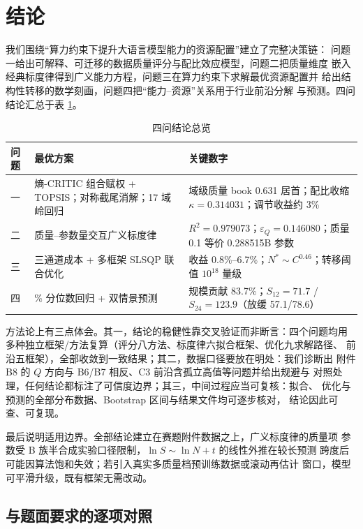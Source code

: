 \section{结论}

我们围绕``算力约束下提升大语言模型能力的资源配置''建立了完整决策链：
问题一给出可解释、可迁移的数据质量评分与配比效应模型，问题二把质量维度
嵌入经典标度律得到广义能力方程，问题三在算力约束下求解最优资源配置并
给出结构性转移的数学刻画，问题四把``能力--资源''关系用于行业前沿分解
与预测。四问结论汇总于表 \ref{tab:conclusion}。

\begin{table}[htbp]
\centering
\caption{四问结论总览}
\label{tab:conclusion}
\small
\begin{tabular}{>{\raggedright\arraybackslash}p{1.7cm}|>{\raggedright\arraybackslash}p{3.6cm}|>{\raggedright\arraybackslash}p{4.7cm}}
\toprule
问题 & 最优方案 & 关键数字 \\
\midrule
一 & 熵-CRITIC 组合赋权 + TOPSIS；对称截尾消解；17 域岭回归 & 域级质量 book 0.631 居首；配比收缩 $\kappa=0.314031$；调节收益约 3\% \\
二 & 质量--参数量交互广义标度律 & $R^2=0.979073$；$\varepsilon_Q=0.146080$；质量 0.1 等价 0.288515B 参数 \\
三 & 三通道成本 + 多框架 SLSQP 联合优化 & 收益 0.8\%--6.7\%；$N^{*}\sim C^{0.46}$；转移阈值 $10^{18}$ 量级 \\
四 & 90\% 分位数回归 + 双情景预测 & 规模贡献 83.7\%；$S_{12}=71.7$ / $S_{24}=123.9$（放缓 57.1/78.6） \\
\bottomrule
\end{tabular}
\end{table}

方法论上有三点体会。其一，结论的稳健性靠交叉验证而非断言：四个问题均用
多种独立框架/方法复算（评分八方法、标度律六拟合框架、优化九求解路径、
前沿五框架），全部收敛到一致结果；其二，数据口径要放在明处：我们诊断出
附件 B8 的 $Q$ 方向与 B6/B7 相反、C3 前沿含孤立高值等问题并给出规避与
对照处理，任何结论都标注了可信度边界；其三，中间过程应当可复核：拟合、
优化与预测的全部分布数据、Bootstrap 区间与结果文件均可逐步核对，
结论因此可查、可复现。

最后说明适用边界。全部结论建立在赛题附件数据之上，广义标度律的质量项
参数受 B 族半合成实验口径限制，$\ln S\sim\ln N+t$ 的线性外推在较长预测
跨度后可能因算法饱和失效；若引入真实多质量档预训练数据或滚动再估计
窗口，模型可平滑升级，既有框架无需改动。

\subsection{与题面要求的逐项对照}

